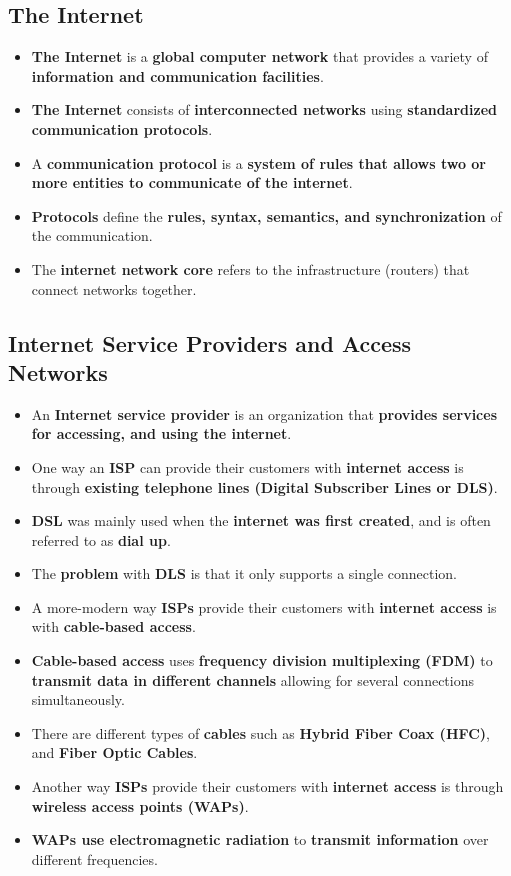 \documentclass{article}
\begin{document}
    \subsection*{The Internet}
    \begin{itemize}
        \item \textbf{The Internet} is a \textbf{global computer network} that provides a variety of \textbf{information and communication facilities}.
        \item \textbf{The Internet} consists of \textbf{interconnected networks} using \textbf{standardized communication protocols}.
        \item A \textbf{communication protocol} is a \textbf{system of rules that allows two or more entities to communicate of the internet}.
        \item \textbf{Protocols} define the \textbf{rules, syntax, semantics, and synchronization} of the communication.
        \item The \textbf{internet network core} refers to the infrastructure (routers) that connect networks together.
   \end{itemize}

   \subsection*{Internet Service Providers and Access Networks}
   \begin{itemize}
       \item An \textbf{Internet service provider} is an organization that \textbf{provides services for accessing, and using the internet}.
       \item One way an \textbf{ISP} can provide their customers with \textbf{internet access} is through \textbf{existing telephone lines (Digital Subscriber Lines or DLS)}.
       \item \textbf{DSL} was mainly used when the \textbf{internet was first created}, and is often referred to as \textbf{dial up}.
       \item The \textbf{problem} with \textbf{DLS} is that it only supports a single connection.
       \item A more-modern way \textbf{ISPs} provide their customers with \textbf{internet access} is with \textbf{cable-based access}.
       \item \textbf{Cable-based access} uses \textbf{frequency division multiplexing (FDM)} to \textbf{transmit data in different channels} allowing for several connections simultaneously.
       \item There are different types of \textbf{cables} such as \textbf{Hybrid Fiber Coax (HFC)}, and \textbf{Fiber Optic Cables}.
       \item Another way \textbf{ISPs} provide their customers with \textbf{internet access} is through \textbf{wireless access points (WAPs)}.
       \item \textbf{WAPs use electromagnetic radiation} to \textbf{transmit information} over different frequencies.
   \end{itemize}
\end{document}
